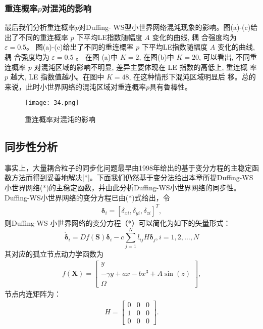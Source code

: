 \subsubsection{重连概率$p$对混沌的影响}
最后我们分析重连概率$p$对Duffing- WS型小世界网络混沌现象的影响。图(a)-(c)给出了不同的重连概率
 $p$ 下平均LE指数随幅度 $A$ 变化的曲线, 耦 合强度均为 $\varepsilon=0.5$。
图(a)-(c)给出了不同的重连概率 $p$ 下平均LE指数随幅度 $A$ 变化的曲线, 耦 合强度均为 $\varepsilon=0.5$ 。
在图 (a)中 $K=2$, 在图(b)中 $K=20$, 可以看出, 不同重 连概率 $p$ 对混沌区域的影响不明显, 
差异主要体现在 LE 指数的高低上, 重连概 率 $p$ 越大, LE 指数值越小。在图中 $K=48$, 在这种情形下混沌区域明显后
移。总的来说，此时小世界网络的混沌区域对重连概率$p$具有鲁棒性。
\begin{figure}[!htbp]
    \centering
    \texttt{[image: 34.png]}
    \caption{重连概率对混沌的影响}
\end{figure}
\subsection{同步性分析}
事实上，大量耦合粒子的同步化问题最早由1998年给出的基于变分方程的主稳定函数方法而得到妥善地解决[*]。下面我们仍然基于变分法给出本章所提Duffing-WS小世界网络(*)的主稳定函数，并由此分析Duffing-WS小世界网络的同步性。
Duffing-WS小世界网络的变分方程已由(*)式给出，令
\begin{eqnarray*}
\boldsymbol{\delta}_{i}=\left[\delta_{xi}, \delta_{yi}, \delta_{zi}\right]^T,
\end{eqnarray*}
则Duffing-WS 小世界网络的变分方程（*）可以简化为如下的矢量形式：
\begin{equation}
    \dot{\boldsymbol{\delta}}_i=D f(\mathbf{S}) \boldsymbol{\delta}_i-c \sum_{j=1}^N l_{i j} H \boldsymbol{\delta}_j, i=1,2, \ldots, N
\end{equation}
其对应的孤立节点动力学函数为
\begin{eqnarray*}
 f(\mathbf{X})=\left[\begin{array}{c}y \\ -\gamma y+a x-b x^3+A \sin (z) \\ \Omega\end{array}\right],
\end{eqnarray*}
节点内连矩阵为：
\begin{eqnarray*}
H=\left[\begin{array}{lll}
0 & 0 & 0 \\
1 & 0 & 0 \\
0 & 0 & 0
\end{array}\right].
\end{eqnarray*}

